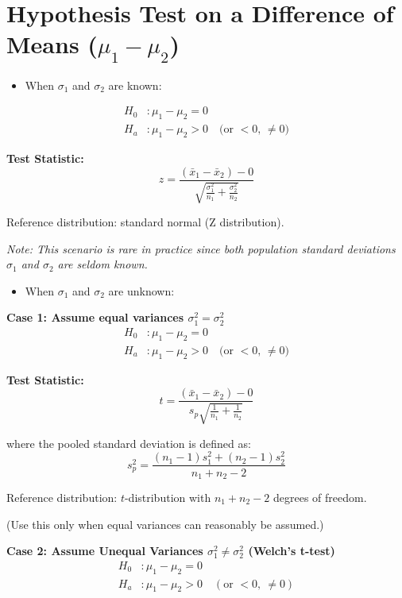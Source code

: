 \section*{Hypothesis Test on a Difference of Means (\texorpdfstring{$\mu_1 - \mu_2$}{mu1 - mu2})}
\begin{itemize}
\item When $\sigma_1$ and $\sigma_2$ are known:
\end{itemize}
\begin{align*}
H_0&: \mu_1 - \mu_2 = 0 \\
H_a&: \mu_1 - \mu_2 > 0 \quad \text{(or } < 0 \text{, } \ne 0 \text{)}
\end{align*}

\textbf{Test Statistic:}
\[
z = \frac{(\bar{x}_1 - \bar{x}_2) - 0}{\sqrt{\frac{\sigma_1^2}{n_1} + \frac{\sigma_2^2}{n_2}}}
\]

Reference distribution: standard normal (Z distribution).

\textit{Note: This scenario is rare in practice since both population standard deviations $\sigma_1$ and $\sigma_2$ are seldom known.}
\vspace{0.5em}
\begin{itemize}
\item When $\sigma_1$ and $\sigma_2$ are unknown: 
\end{itemize}
\vspace{1.0em}
\textbf{Case 1: Assume equal variances $\sigma_1^2 = \sigma_2^2$}
\vspace{0.5em}
\begin{align*}
H_0&: \mu_1 - \mu_2 = 0 \\
H_a&: \mu_1 - \mu_2 > 0 \quad \text{(or } < 0 \text{, } \ne 0 \text{)}
\end{align*}

\textbf{Test Statistic:}
\[
t = \frac{(\bar{x}_1 - \bar{x}_2) - 0}{s_p \sqrt{\frac{1}{n_1} + \frac{1}{n_2}}}
\]

where the pooled standard deviation is defined as:
\[
s_p^2 = \frac{(n_1 - 1)s_1^2 + (n_2 - 1)s_2^2}{n_1 + n_2 - 2}
\]

Reference distribution: $t$-distribution with $n_1 + n_2 - 2$ degrees of freedom.

(Use this only when equal variances can reasonably be assumed.) \\
\vspace{1.0em}

\noindent \textbf{Case 2: Assume Unequal Variances $\sigma_1^2 \ne \sigma_2^2$ (Welch's t-test)}
\vspace{0.5em}
\begin{align*}
H_0 &: \mu_1 - \mu_2 = 0 \\
H_a &: \mu_1 - \mu_2 > 0 \quad (\text{or } < 0,\ \ne 0)
\end{align*}

